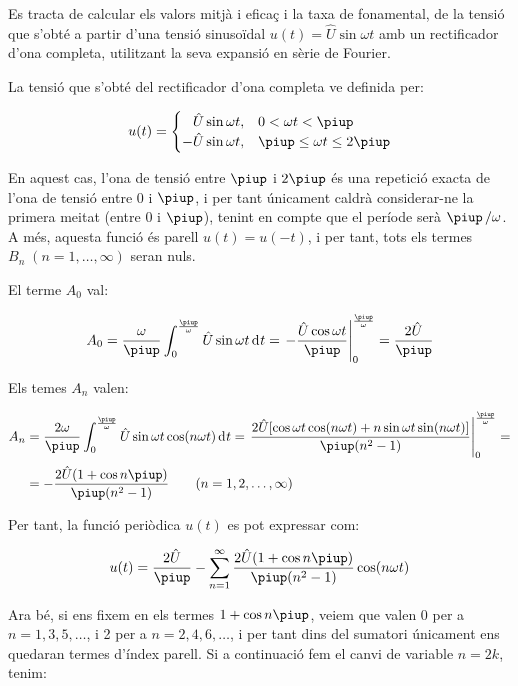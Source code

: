 \begin{exemple}
    Es tracta de calcular els valors mitjà i eficaç i la taxa de
    fonamental, de la tensió que s'obté a partir d'una tensió
    sinusoïdal $u(t) = \hat{U} \sin\omega t$ amb un rectificador d'ona
    completa, utilitzant la seva expansió en sèrie de Fourier.

    La tensió que s'obté del rectificador d'ona completa ve definida
    per:

    \[
    u(t) = \begin{cases} \phantom{-}\hat{U} \sin\omega t, & 0 < \omega t < \piup\\
           -\hat{U} \sin\omega t, & \piup \leq \omega t \leq 2\piup \end{cases}
    \]

    En aquest cas, l'ona de tensió entre $\piup$ i $2\piup$ és una repetició
    exacta de l'ona de tensió entre 0 i $\piup$, i per tant únicament
    caldrà considerar-ne la primera meitat (entre 0 i $\piup$), tenint en
    compte que el període serà $\piup\,/\omega$. A més, aquesta funció és
    parell $u(t) = u(-t)$, i per tant, tots els termes
    $B_n\;(n=1,\ldots,\infty)$ seran nuls.

    El terme $A_0$ val:

    \[
    A_0 = \frac{\omega}{\piup} \int_0^{\frac{\piup}{\omega}} \hat{U} \sin
    \omega t \diff t = \left. -\frac{\hat{U} \cos \omega t}{\piup}
    \right|_0^{\frac{\piup}{\omega}} = \frac{2\hat{U}}{\piup}
    \]

    Els temes $A_n$ valen:

    \[
    \begin{split}
    A_n &= \frac{2 \omega}{\piup} \int_0^{\frac{\piup}{\omega}} \hat{U} \sin
    \omega t \cos(n \omega t)\diff t = \left. \frac{2 \hat{U}[ \cos
    \omega t \cos (n \omega t) + n \sin \omega t \sin(n \omega
    t)]}{\piup(n^2-1)} \right|_0^{\frac{\piup}{\omega}}=\\[0.5ex]
    &= -\frac{2\hat{U}(1+\cos n \piup)}{\piup(n^2-1)}
    \qquad(n=1,2,\ldots,\infty)
    \end{split}
    \]

    Per tant, la funció periòdica $u(t)$ es pot expressar com:

    \[
        u(t) = \frac{2\hat{U}}{\piup} - \sum_{n=1}^\infty
         \frac{2\hat{U}(1+\cos n \piup)}{\piup(n^2-1)} \cos(n \omega t)
    \]

    Ara bé, si ens fixem en els termes $1+\cos n \piup$, veiem que valen 0
    per a $n=1,3,5,\ldots$, i 2 per a $n=2,4,6,\ldots$, i per tant dins
    del sumatori únicament ens quedaran termes d'índex parell. Si a
    continuació fem el canvi de variable $n=2k$, tenim:


\end{exemple}

